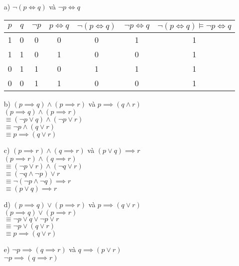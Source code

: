 \documentclass[a4paper]{article}
\begin{document}
	\begin{enumerate}
	\item[a)] $\lnot (p \iff q)$ và $\lnot p \iff q$
	\begin{table} [h]
		\centering
		\begin{tabular} {|c|c|c|c|c|c|c|}
			\hline
			$p$&$q$&$\lnot p$&$  p \iff q$&$\lnot (p \iff q)$&$ \lnot p \iff q$& $\lnot (p \iff q) \vDash \lnot p \iff q$\\
			\hline
			1&0&0&0&0&1&1\\
			1&1&0&1&0&0&1\\
			0&1&1&0&1&1&1\\
			0&0&1&1&0&0&1\\
			\hline
		\end{tabular}
	\end{table}
	\item[b)]	$(p \implies q) \land (p \implies r) $ và $ p \implies (q \land r)$\\
				$(p \implies q) \land (p \implies r)$\\
				$\equiv (\lnot p \lor q) \land (\lnot p \lor r)$\\
				$\equiv  \lnot p \land (q \lor r)$\\
				$\equiv  p \implies (q \lor r)$\\
	\item[c)]   $(p\implies r) \land (q \implies r) $ và $ (p \lor q) \implies r$\\ 
				$(p\implies r) \land (q \implies r)$\\
				$\equiv (\lnot p \lor r) \land (\lnot q \lor r)$\\
				$\equiv (\lnot q \land \lnot p) \lor r$\\
				$\equiv  \lnot(\lnot p \land \lnot q) \implies r$\\
				$\equiv (p \lor q) \implies r$\\
	\item[d)]	$(p \implies q) \lor (p \implies r) $ và $ p \implies (q \lor r)$\\
				$(p \implies q) \lor (p \implies r)$\\
				$\equiv  \lnot p \lor q \lor \lnot p \lor r$\\
				$\equiv  \lnot p \lor (q \lor r)$\\ $\equiv  p \implies (q \lor r)$\\
	\item[e)]	$\lnot p \implies (q \implies r) $ và $ q \implies (p \lor r)$\\
				$\lnot p \implies (q \implies r)$\\

\end{enumerate}
\end{document}
